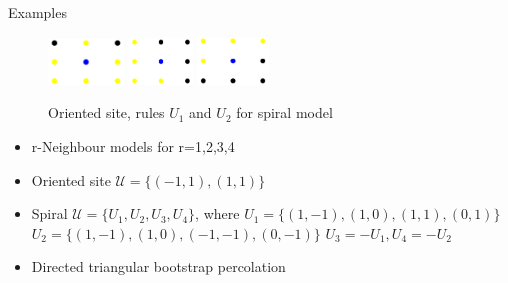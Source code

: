 \begin{frame}{Examples}

\begin{figure}[t]
    \includegraphics[width=0.18\textwidth]{rgospercrule.png}
    \includegraphics[width=0.15\textwidth]{rgspiralpercrule1.png}
    \includegraphics[width=0.17\textwidth]{rgspiralpercrule2.png}
    \caption{Oriented site, rules $U_1$ and $U_2$ for spiral model}
    \label{fig:mesh1}
\end{figure}
\begin{itemize}
    \item r-Neighbour models for r=1,2,3,4
    \item Oriented site $\mathscr{U}=\{(-1,1),(1,1)\}$
    \item Spiral $\mathscr{U}=\{U_1,U_2,U_3,U_4\}$, where 
    $U_1=\{(1,-1),(1,0),(1,1),(0,1)\}$
    \newline
    $U_2=\{(1,-1),(1,0),(-1,-1),(0,-1)\}
    $
    \newline
    $ U_3=-U_1, U_4=-U_2$
    \item Directed triangular bootstrap percolation 
    

\end{itemize}



\end{frame}

